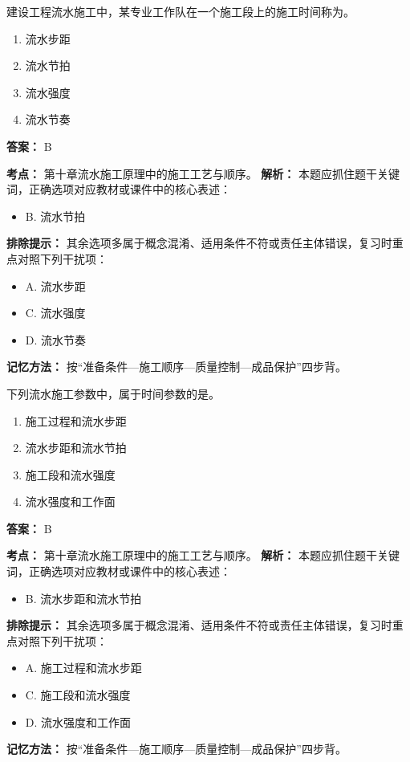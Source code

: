 \documentclass[UTF8,fontset=fandol,11pt]{ctexart}
\begin{document}
\begin{quizbox}[title={第 5 题}]
建设工程流水施工中，某专业工作队在一个施工段上的施工时间称为。\\
\begin{enumerate}[label=\Alph*.]
\item 流水步距
\item 流水节拍
\item 流水强度
\item 流水节奏
\end{enumerate}
\textbf{答案：} B
\vspace{0.25em}
\begin{answerbox}[title={考点解析}]
\textbf{考点：} 第十章流水施工原理中的施工工艺与顺序。
\textbf{解析：} 本题应抓住题干关键词，正确选项对应教材或课件中的核心表述：
\begin{itemize}
\item B. 流水节拍
\end{itemize}
\textbf{排除提示：} 其余选项多属于概念混淆、适用条件不符或责任主体错误，复习时重点对照下列干扰项：
\begin{itemize}
\item A. 流水步距
\item C. 流水强度
\item D. 流水节奏
\end{itemize}
\textbf{记忆方法：} 按“准备条件—施工顺序—质量控制—成品保护”四步背。
\end{answerbox}
\end{quizbox}

\begin{quizbox}[title={第 6 题}]
下列流水施工参数中，属于时间参数的是。\\
\begin{enumerate}[label=\Alph*.]
\item 施工过程和流水步距
\item 流水步距和流水节拍
\item 施工段和流水强度
\item 流水强度和工作面
\end{enumerate}
\textbf{答案：} B
\vspace{0.25em}
\begin{answerbox}[title={考点解析}]
\textbf{考点：} 第十章流水施工原理中的施工工艺与顺序。
\textbf{解析：} 本题应抓住题干关键词，正确选项对应教材或课件中的核心表述：
\begin{itemize}
\item B. 流水步距和流水节拍
\end{itemize}
\textbf{排除提示：} 其余选项多属于概念混淆、适用条件不符或责任主体错误，复习时重点对照下列干扰项：
\begin{itemize}
\item A. 施工过程和流水步距
\item C. 施工段和流水强度
\item D. 流水强度和工作面
\end{itemize}
\textbf{记忆方法：} 按“准备条件—施工顺序—质量控制—成品保护”四步背。
\end{answerbox}
\end{quizbox}
\end{document}
